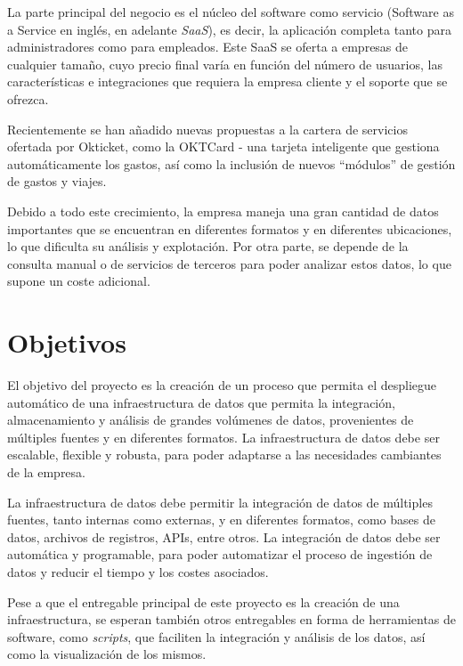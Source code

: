 La parte principal del negocio es el núcleo del software como servicio (Software
as a Service en inglés, en adelante \textit{SaaS}), es decir, la aplicación
completa tanto para administradores como para empleados. Este SaaS se oferta a
empresas de cualquier tamaño, cuyo precio final varía en función del número de
usuarios, las características e integraciones que requiera la empresa cliente y
el soporte que se ofrezca.

Recientemente se han añadido nuevas propuestas a la cartera de servicios
ofertada por Okticket, como la OKTCard {-} una tarjeta inteligente que gestiona
automáticamente los gastos, así como la inclusión de nuevos ``módulos'' de
gestión de gastos y viajes.

Debido a todo este crecimiento, la empresa maneja una gran cantidad de datos
importantes que se encuentran en diferentes formatos y en diferentes
ubicaciones, lo que dificulta su análisis y explotación. Por otra parte, se
depende de la consulta manual o de servicios de terceros para poder analizar
estos datos, lo que supone un coste adicional.

\section{Objetivos}\label{sec:objetivos}
El objetivo del proyecto es la creación de un proceso que permita el despliegue
automático de una infraestructura de datos que permita la integración,
almacenamiento y análisis de grandes volúmenes de datos, provenientes de
múltiples fuentes y en diferentes formatos. La infraestructura de datos debe ser
escalable, flexible y robusta, para poder adaptarse a las necesidades cambiantes
de la empresa.

La infraestructura de datos debe permitir la integración de datos de múltiples
fuentes, tanto internas como externas, y en diferentes formatos, como bases de
datos, archivos de registros, APIs, entre otros. La integración de datos debe
ser automática y programable, para poder automatizar el proceso de ingestión de
datos y reducir el tiempo y los costes asociados.

Pese a que el entregable principal de este proyecto es la creación de una
infraestructura, se esperan también otros entregables en forma de herramientas
de software, como \textit{scripts}, que faciliten la integración y análisis de
los datos, así como la visualización de los mismos.

